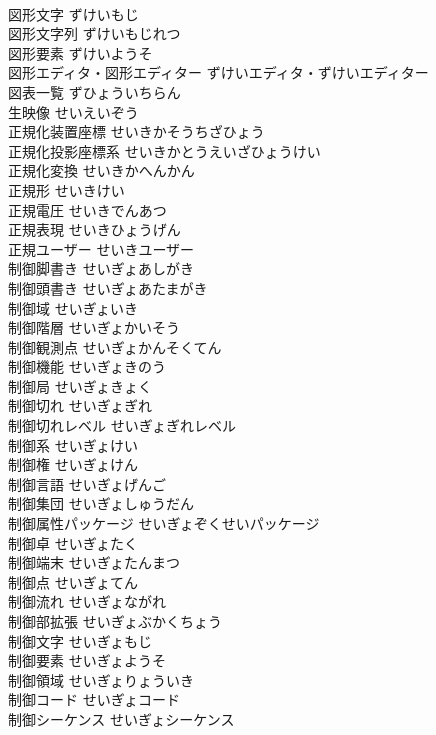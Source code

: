 \documentclass[8pt]{extreport}
\begin{document}
\begin{CJK}{UTF8}{min}
\\	図形文字	ずけいもじ	
\\	図形文字列	ずけいもじれつ	
\\	図形要素	ずけいようそ	
\\	図形エディタ・図形エディター	ずけいエディタ・ずけいエディター	
\\	図表一覧	ずひょういちらん	
\\	生映像	せいえいぞう	
\\	正規化装置座標	せいきかそうちざひょう	
\\	正規化投影座標系	せいきかとうえいざひょうけい	
\\	正規化変換	せいきかへんかん	
\\	正規形	せいきけい	
\\	正規電圧	せいきでんあつ	
\\	正規表現	せいきひょうげん	
\\	正規ユーザー	せいきユーザー	
\\	制御脚書き	せいぎょあしがき	
\\	制御頭書き	せいぎょあたまがき	
\\	制御域	せいぎょいき	
\\	制御階層	せいぎょかいそう	
\\	制御観測点	せいぎょかんそくてん	
\\	制御機能	せいぎょきのう	
\\	制御局	せいぎょきょく	
\\	制御切れ	せいぎょぎれ	
\\	制御切れレベル	せいぎょぎれレベル	
\\	制御系	せいぎょけい	
\\	制御権	せいぎょけん	
\\	制御言語	せいぎょげんご	
\\	制御集団	せいぎょしゅうだん	
\\	制御属性パッケージ	せいぎょぞくせいパッケージ	
\\	制御卓	せいぎょたく	
\\	制御端末	せいぎょたんまつ	
\\	制御点	せいぎょてん	
\\	制御流れ	せいぎょながれ	
\\	制御部拡張	せいぎょぶかくちょう	
\\	制御文字	せいぎょもじ	
\\	制御要素	せいぎょようそ	
\\	制御領域	せいぎょりょういき	
\\	制御コード	せいぎょコード	
\\	制御シーケンス	せいぎょシーケンス	

\end{CJK}
\end{document}
